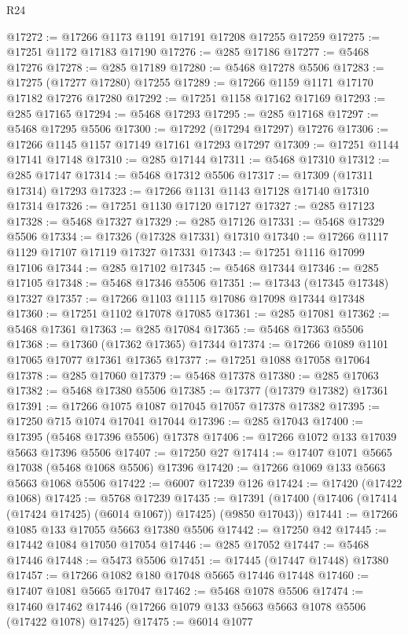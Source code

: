 \begin{lexlean}{R24}
\begin{coremodule}
@17272 := @17266 @1173 @1191 @17191 @17208 @17255 @17259
@17275 := @17251 @1172 @17183 @17190
@17276 := @285 @17186
@17277 := @5468 @17276
@17278 := @285 @17189
@17280 := @5468 @17278 @5506
@17283 := @17275 (@17277 @17280) @17255
@17289 := @17266 @1159 @1171 @17170 @17182 @17276 @17280
@17292 := @17251 @1158 @17162 @17169
@17293 := @285 @17165
@17294 := @5468 @17293
@17295 := @285 @17168
@17297 := @5468 @17295 @5506
@17300 := @17292 (@17294 @17297) @17276
@17306 := @17266 @1145 @1157 @17149 @17161 @17293 @17297
@17309 := @17251 @1144 @17141 @17148
@17310 := @285 @17144
@17311 := @5468 @17310
@17312 := @285 @17147
@17314 := @5468 @17312 @5506
@17317 := @17309 (@17311 @17314) @17293
@17323 := @17266 @1131 @1143 @17128 @17140 @17310 @17314
@17326 := @17251 @1130 @17120 @17127
@17327 := @285 @17123
@17328 := @5468 @17327
@17329 := @285 @17126
@17331 := @5468 @17329 @5506
@17334 := @17326 (@17328 @17331) @17310
@17340 := @17266 @1117 @1129 @17107 @17119 @17327 @17331
@17343 := @17251 @1116 @17099 @17106
@17344 := @285 @17102
@17345 := @5468 @17344
@17346 := @285 @17105
@17348 := @5468 @17346 @5506
@17351 := @17343 (@17345 @17348) @17327
@17357 := @17266 @1103 @1115 @17086 @17098 @17344 @17348
@17360 := @17251 @1102 @17078 @17085
@17361 := @285 @17081
@17362 := @5468 @17361
@17363 := @285 @17084
@17365 := @5468 @17363 @5506
@17368 := @17360 (@17362 @17365) @17344
@17374 := @17266 @1089 @1101 @17065 @17077 @17361 @17365
@17377 := @17251 @1088 @17058 @17064
@17378 := @285 @17060
@17379 := @5468 @17378
@17380 := @285 @17063
@17382 := @5468 @17380 @5506
@17385 := @17377 (@17379 @17382) @17361
@17391 := @17266 @1075 @1087 @17045 @17057 @17378 @17382
@17395 := @17250 @715 @1074 @17041 @17044
@17396 := @285 @17043
@17400 := @17395 (@5468 @17396 @5506) @17378
@17406 := @17266 @1072 @133 @17039 @5663 @17396 @5506
@17407 := @17250 @27
@17414 := @17407 @1071 @5665 @17038 (@5468 @1068 @5506) @17396
@17420 := @17266 @1069 @133 @5663 @5663 @1068 @5506
@17422 := @6007 @17239 @126
@17424 := @17420 (@17422 @1068)
@17425 := @5768 @17239
@17435 := @17391 (@17400 (@17406 (@17414 (@17424 @17425) (@6014 @1067)) @17425) (@9850 @17043))
@17441 := @17266 @1085 @133 @17055 @5663 @17380 @5506
@17442 := @17250 @42
@17445 := @17442 @1084 @17050 @17054
@17446 := @285 @17052
@17447 := @5468 @17446
@17448 := @5473 @5506
@17451 := @17445 (@17447 @17448) @17380
@17457 := @17266 @1082 @180 @17048 @5665 @17446 @17448
@17460 := @17407 @1081 @5665 @17047
@17462 := @5468 @1078 @5506
@17474 := @17460 @17462 @17446 (@17266 @1079 @133 @5663 @5663 @1078 @5506 (@17422 @1078) @17425)
@17475 := @6014 @1077

\end{coremodule}
\end{lexlean}
